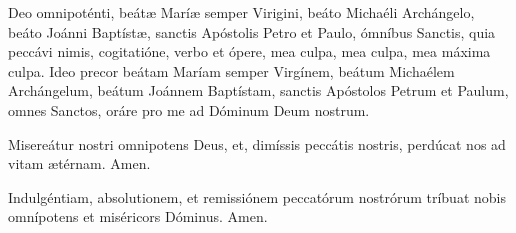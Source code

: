 Deo omnipoténti, beát{\ae} Marí{\ae} semper Virigini, beáto Michaéli Archángelo, beáto Joánni Baptíst{\ae}, sanctis 
Apóstolis Petro et Paulo, ómníbus Sanctis, quia peccávi nimis, cogitatióne, verbo et ópere, mea culpa, mea culpa, mea máxima culpa. Ideo precor beátam
Maríam semper Virgínem, beátum Michaélem Archángelum, beátum Joánnem Baptístam, sanctis Apóstolos Petrum et Paulum, omnes Sanctos,
oráre pro me ad Dóminum Deum nostrum.

\vspace{0.5mm}

Misereátur nostri omnipotens Deus, et, dimíssis peccátis nostris, perdúcat nos ad vitam {\ae}térnam. Amen.

\vspace{0.5mm}

Indulgéntiam, absolutionem, et remissiónem peccatórum nostrórum tríbuat nobis omnípotens et miséricors Dóminus. Amen.